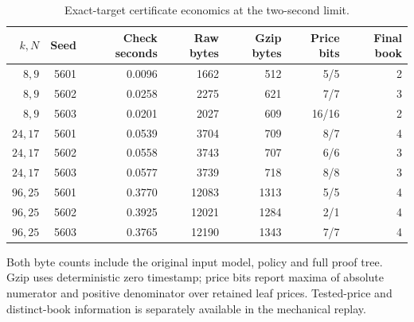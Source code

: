 \begin{table}[p]\centering\small\caption{Exact-target certificate economics at the two-second limit.}\label{tab:proof56}
\begin{tabular}{@{}rrrrrrr@{}}\toprule
$k,N$ & Seed & Check seconds & Raw bytes & Gzip bytes & Price bits & Final book \\ \midrule
$8,9$ & 5601 & 0.0096 & 1662 & 512 & 5/5 & 2 \\
$8,9$ & 5602 & 0.0258 & 2275 & 621 & 7/7 & 3 \\
$8,9$ & 5603 & 0.0201 & 2027 & 609 & 16/16 & 2 \\
$24,17$ & 5601 & 0.0539 & 3704 & 709 & 8/7 & 4 \\
$24,17$ & 5602 & 0.0558 & 3743 & 707 & 6/6 & 3 \\
$24,17$ & 5603 & 0.0577 & 3739 & 718 & 8/8 & 3 \\
$96,25$ & 5601 & 0.3770 & 12083 & 1313 & 5/5 & 4 \\
$96,25$ & 5602 & 0.3925 & 12021 & 1284 & 2/1 & 4 \\
$96,25$ & 5603 & 0.3765 & 12190 & 1343 & 7/7 & 4 \\
\bottomrule\end{tabular}
\par\smallskip\begin{minipage}{\textwidth}\footnotesize Both byte counts include the original input model, policy and full proof tree. Gzip uses deterministic zero timestamp; price bits report maxima of absolute numerator and positive denominator over retained leaf prices. Tested-price and distinct-book information is separately available in the mechanical replay.\end{minipage}
\end{table}\clearpage
